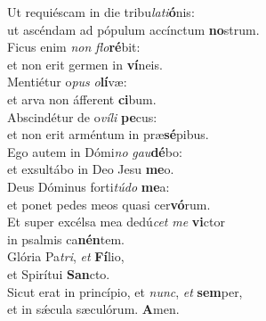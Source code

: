 \evenverse Ut requiéscam in die tribu\textit{la}\textit{ti}\textbf{ó}nis:~\*\\
\evenverse ut ascéndam ad pópulum accínctum \textbf{no}strum.\\
\oddverse Ficus enim \textit{non} \textit{flo}\textbf{ré}bit:~\*\\
\oddverse et non erit germen in \textbf{ví}neis.\\
\evenverse Mentiétur o\textit{pus} \textit{o}\textbf{lí}væ:~\*\\
\evenverse et arva non áfferent \textbf{ci}bum.\\
\oddverse Abscindétur de o\textit{ví}\textit{li} \textbf{pe}cus:~\*\\
\oddverse et non erit arméntum in præ\textbf{sé}pibus.\\
\evenverse Ego autem in Dómi\textit{no} \textit{gau}\textbf{dé}bo:~\*\\
\evenverse et exsultábo in Deo Jesu \textbf{me}o.\\
\oddverse Deus Dóminus forti\textit{tú}\textit{do} \textbf{me}a:~\*\\
\oddverse et ponet pedes meos quasi cer\textbf{vó}rum.\\
\evenverse Et super excélsa mea dedú\textit{cet} \textit{me} \textbf{vi}ctor~\*\\
\evenverse in psalmis ca\textbf{nén}tem.\\
\oddverse Glória Pa\textit{tri}, \textit{et} \textbf{Fí}lio,~\*\\
\oddverse et Spirítui \textbf{San}cto.\\
\evenverse Sicut erat in princípio, et \textit{nunc}, \textit{et} \textbf{sem}per,~\*\\
\evenverse et in sǽcula sæculórum. \textbf{A}men.\\
